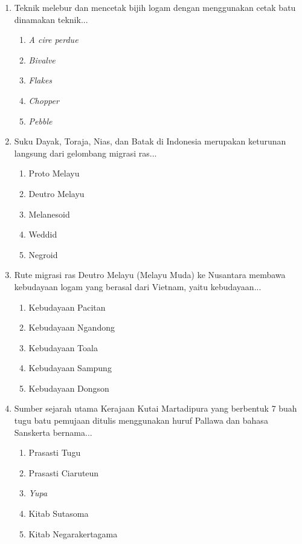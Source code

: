 \documentclass[12pt, a4paper]{article}
\begin{document}
\begin{enumerate}[label=\arabic*.]
    \item Teknik melebur dan mencetak bijih logam dengan menggunakan cetak batu dinamakan teknik...
    \begin{enumerate}[label=\Alph*.]
        \item \textit{A cire perdue}
        \item \textit{Bivalve}
        \item \textit{Flakes}
        \item \textit{Chopper}
        \item \textit{Pebble}
    \end{enumerate}

    \item Suku Dayak, Toraja, Nias, dan Batak di Indonesia merupakan keturunan langsung dari gelombang migrasi ras...
    \begin{enumerate}[label=\Alph*.]
        \item Proto Melayu
        \item Deutro Melayu
        \item Melanesoid
        \item Weddid
        \item Negroid
    \end{enumerate}

    \item Rute migrasi ras Deutro Melayu (Melayu Muda) ke Nusantara membawa kebudayaan logam yang berasal dari Vietnam, yaitu kebudayaan...
    \begin{enumerate}[label=\Alph*.]
        \item Kebudayaan Pacitan
        \item Kebudayaan Ngandong
        \item Kebudayaan Toala
        \item Kebudayaan Sampung
        \item Kebudayaan Dongson
    \end{enumerate}

    \item Sumber sejarah utama Kerajaan Kutai Martadipura yang berbentuk 7 buah tugu batu pemujaan ditulis menggunakan huruf Pallawa dan bahasa Sanskerta bernama...
    \begin{enumerate}[label=\Alph*.]
        \item Prasasti Tugu
        \item Prasasti Ciaruteun
        \item \textit{Yupa}
        \item Kitab Sutasoma
        \item Kitab Negarakertagama
    \end{enumerate}


\end{enumerate}
\end{document}
